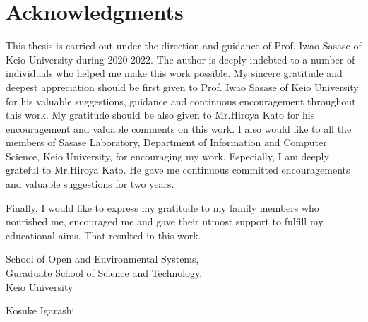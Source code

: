 \chapter*{Acknowledgments}

This thesis is carried out under the direction and guidance of Prof. Iwao Sasase of Keio University during 2020-2022.
The author is deeply indebted to a number of individuals who helped me make this work possible.  
My sincere gratitude and deepest appreciation should be first given to Prof. Iwao Sasase of Keio University for his valuable suggestions, guidance and continuous encouragement throughout this work.
My gratitude should be also given to Mr.Hiroya Kato for his encouragement and valuable comments on this work.
I also would like to all the members of Sasase Laboratory, Department of Information and Computer Science, Keio University, for encouraging my work.  
Especially, I am deeply grateful to Mr.Hiroya Kato.
He gave me continuous committed encouragements and valuable suggestions for two years.

Finally, I would like to express my gratitude to my family members who nourished me, encouraged me and gave their utmost support to fulfill my educational aims.
That resulted in this work.  
\sl
\vspace{1.5cm}
\begin{flushleft}\baselineskip=18pt
School of Open and Environmental Systems,\\ Guraduate School of Science and Technology,\\
Keio University
\end{flushleft}

\bf
\vspace{0.5cm}
\begin{flushright}
Kosuke Igarashi\\
\end{flushright}
